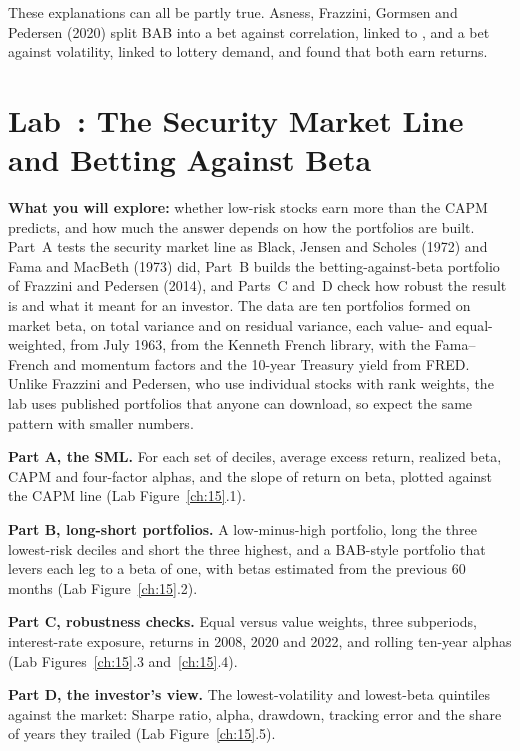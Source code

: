 These explanations can all be partly true. Asness, Frazzini, Gormsen and Pedersen (2020) split BAB into a bet against correlation, linked to , and a bet against volatility, linked to lottery demand, and found that both earn returns.

\section{Lab~\thechapter: The Security Market Line and Betting Against Beta}
\label{sec:18-lab}

\textbf{What you will explore:} whether low-risk stocks earn more than the CAPM predicts, and how much the answer depends on how the portfolios are built. Part~A tests the security market line as Black, Jensen and Scholes (1972) and Fama and MacBeth (1973) did, Part~B builds the betting-against-beta portfolio of Frazzini and Pedersen (2014), and Parts~C and~D check how robust the result is and what it meant for an investor. The data are ten portfolios formed on market beta, on total variance and on residual variance, each value- and equal-weighted, from July 1963, from the Kenneth French library, with the Fama--French and momentum factors and the 10-year Treasury yield from FRED. Unlike Frazzini and Pedersen, who use individual stocks with rank weights, the lab uses published portfolios that anyone can download, so expect the same pattern with smaller numbers.

\textbf{Part A, the SML.} For each set of deciles, average excess return, realized beta, CAPM and four-factor alphas, and the slope of return on beta, plotted against the CAPM line (Lab Figure~\ref{ch:15}.1).

\textbf{Part B, long-short portfolios.} A low-minus-high portfolio, long the three lowest-risk deciles and short the three highest, and a BAB-style portfolio that levers each leg to a beta of one, with betas estimated from the previous 60 months (Lab Figure~\ref{ch:15}.2).

\textbf{Part C, robustness checks.} Equal versus value weights, three subperiods, interest-rate exposure, returns in 2008, 2020 and 2022, and rolling ten-year alphas (Lab Figures~\ref{ch:15}.3 and~\ref{ch:15}.4).

\textbf{Part D, the investor's view.} The lowest-volatility and lowest-beta quintiles against the market: Sharpe ratio, alpha, drawdown, tracking error and the share of years they trailed (Lab Figure~\ref{ch:15}.5).

